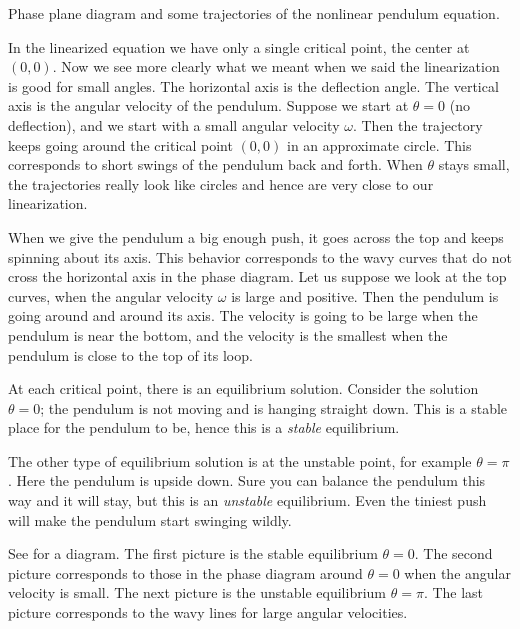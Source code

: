 \begin{myfig}
\capstart
{}
\caption{Phase plane diagram and some trajectories of
the nonlinear pendulum equation. \label{fig:nlin-pend-phasediag}}
\end{myfig}

In the linearized equation we have only a single critical point, the center
at $(0,0)$.  Now we see more clearly what we meant when we said the
linearization is good for small angles.  The horizontal axis is the
deflection angle.  The vertical axis is the angular velocity of the
pendulum.  Suppose we start at $\theta = 0$ (no deflection), and
we start with a small angular velocity $\omega$.  Then the trajectory keeps going
around the critical point $(0,0)$ in an approximate circle.  This
corresponds to short swings of the pendulum back and forth.  When $\theta$
stays small, the trajectories really look like circles and hence are very
close to our linearization.

When we give the pendulum a big enough push, it
goes across the top and keeps spinning about its axis.  This behavior
corresponds to the
wavy curves that do not cross the horizontal axis in the phase diagram.
Let us suppose we look at the top curves, when the angular velocity $\omega$
is large and positive.  Then the pendulum is going
around and around its axis.  The velocity is going to
be large when the pendulum is near the bottom, and the velocity is the
smallest when the pendulum
is close to the top of its loop.

At each critical point, there is an equilibrium solution.  Consider
the solution
$\theta = 0$;  the pendulum is not moving
and is hanging straight down.  This is a stable place for the
pendulum to be, hence this is a \emph{stable} equilibrium.

The other type of equilibrium solution is at the unstable point, for example
$\theta = \pi$.  Here the pendulum is upside down.  Sure you can balance the
pendulum this way and it will stay, but this is an \emph{unstable} equilibrium.
Even the tiniest push will make the pendulum start swinging wildly.

See  for a diagram.  The first picture is the
stable equilibrium $\theta = 0$.  The second picture corresponds to those
 in the phase diagram around $\theta =0$ when the angular
velocity is small.  The next picture is the unstable equilibrium $\theta =
\pi$.  The last picture corresponds to the wavy lines for large angular
velocities.

